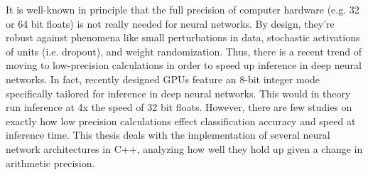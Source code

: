 It is well-known in principle that the full precision of computer hardware (e.g. 32 or 64 bit floats) is not really needed for neural networks. By design, they're robust against phenomena like small perturbations in data, stochastic activations of units (i.e. dropout), and weight randomization. Thus, there is a recent trend of moving to low-precision calculations in order to speed up inference in deep neural networks. In fact, recently designed GPUs feature an 8-bit integer mode specifically tailored for inference in deep neural networks. This would in theory run inference at 4x the speed of 32 bit floats. However, there are few studies on exactly how low precision calculations effect classification accuracy and speed at inference time. This thesis deals with the implementation of several neural network architectures in C++, analyzing how well they hold up given a change in arithmetic precision.